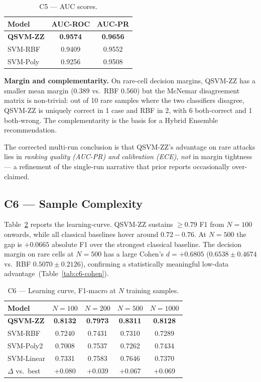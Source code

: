 \documentclass[journal]{IEEEtran}
\newcommand{\ZZ}{\textsc{ZZ}}
\newcommand{\QSVM}{QSVM-\ZZ}
\begin{document}
  \begin{table}[t]
  \centering
  \caption{C5 --- AUC scores.}
  \label{tab:c5-auc}
  \small
  \begin{tabular}{lcc}
  \toprule
  Model & AUC-ROC & AUC-PR\\\midrule
  \textbf{QSVM-\ZZ{}} & \textbf{0.9574} & \textbf{0.9656}\\
  SVM-RBF             & 0.9409 & 0.9552\\
  SVM-Poly            & 0.9256 & 0.9508\\
  \bottomrule
  \end{tabular}
  \end{table}

  \textbf{Margin and complementarity.} On rare-cell decision margins,
  \QSVM{} has a smaller mean margin ($0.389$ vs.\ RBF $0.560$) but the
  McNemar disagreement matrix is non-trivial: out of 10 rare samples
  where the two classifiers disagree, \QSVM{} is uniquely correct in 1
  case and RBF in 2, with 6 both-correct and 1 both-wrong. The
  complementarity is the basis for a Hybrid Ensemble recommendation.

  The corrected multi-run conclusion is that \QSVM{}'s advantage on
  rare attacks lies in \emph{ranking quality (AUC-PR) and calibration
  (ECE)}, \emph{not} in margin tightness --- a refinement of the
  single-run narrative that prior reports occasionally over-claimed.

  \subsection{C6 --- Sample Complexity}
  Table~\ref{tab:c6-learning} reports the learning-curve. \QSVM{}
  sustains $\ge 0.79$ F1 from $N{=}100$ onwards, while all classical
  baselines hover around $0.72{-}0.76$. At $N{=}500$ the gap is
  $+0.0665$ absolute F1 over the strongest classical baseline. The
  decision margin on rare cells at $N{=}500$ has a large Cohen's
  $d{=}+0.6805$ ($0.6538{\pm}0.4674$ vs.\ RBF
  $0.5070{\pm}0.2126$), confirming a statistically meaningful low-data
  advantage~(Table~\ref{tab:c6-cohen}).

  \begin{table}[t]
  \centering
  \caption{C6 --- Learning curve, F1-macro at $N$ training samples.}
  \label{tab:c6-learning}
  \small
  \begin{tabular}{lcccc}
  \toprule
  Model & $N{=}100$ & $N{=}200$ & $N{=}500$ & $N{=}1000$\\\midrule
  \textbf{QSVM-\ZZ{}} & \textbf{0.8132} & \textbf{0.7973} & \textbf{0.8311} & \textbf{0.8128}\\
  SVM-RBF             & 0.7240 & 0.7431 & 0.7310 & 0.7289\\
  SVM-Poly2           & 0.7008 & 0.7537 & 0.7262 & 0.7434\\
  SVM-Linear          & 0.7331 & 0.7583 & 0.7646 & 0.7370\\
  $\Delta$ vs.\ best  & $+$0.080 & $+$0.039 & $+$0.067 & $+$0.069\\
  \bottomrule
  \end{tabular}
  \end{table}
\end{document}
